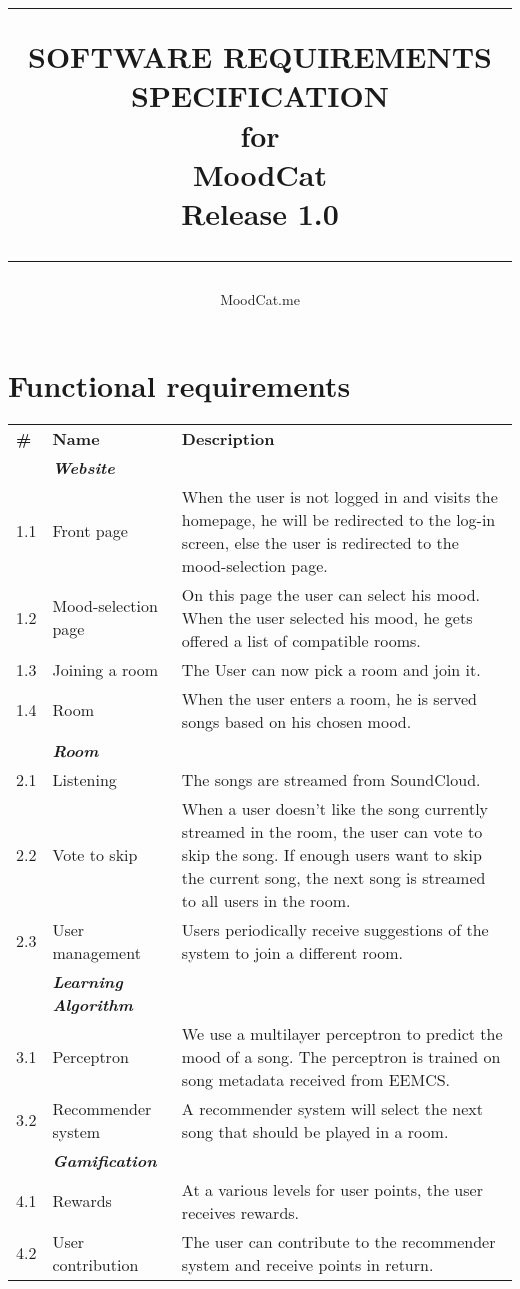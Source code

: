 \documentclass{scrreprt}
\title{%
\flushright
\rule{16cm}{5pt}\vskip1cm
\Huge{SOFTWARE REQUIREMENTS\\ SPECIFICATION}\\
\vspace{2cm}
for\\
\vspace{2cm}
MoodCat\\
\vspace{2cm}
\LARGE{Release 1.0\\}
\vfill
\rule{16cm}{5pt}
}
\author{MoodCat.me}
\date{}
\begin{document}
\maketitle



\chapter*{Functional requirements}
\begin{table}[h]
\begin{tabular}{|p{0.5cm}|p{3.8cm}|p{13.4cm}|}
\textbf{\#} & \textbf{Name} & \textbf{Description} \\
         & \textbf{\textit{Website}} &  \\
   	  1.1   & Front page & When the user is not logged in and visits the homepage, he will be redirected to the log-in screen, else the user is redirected to the mood-selection page.  \\
      1.2   & Mood-selection page & On this page the user can select his mood. When the user selected his mood, he gets offered a list of compatible rooms.\\
      1.3	& Joining a room & The User can now pick a room and join it. \\
      1.4  	& Room & When the user enters a room, he is served songs based on his chosen mood. \\   
      		 
       	& \textbf{\textit{Room}} & \\
	  2.1   & Listening & The songs are streamed from SoundCloud.\\
	  2.2   & Vote to skip & When a user doesn't like the song currently streamed in the room, the user can vote to skip the song. If enough users want to skip the current song, the next song is streamed to all users in the room. \\
	  2.3   & User management  & Users periodically receive suggestions of the system to join a different room. \\
	  	& \textbf{\textit{Learning Algorithm}} & \\
	  3.1   & Perceptron & We use a multilayer perceptron to predict the mood of a song. The perceptron is trained on song metadata received from EEMCS.\\
	  3.2   & Recommender system & A recommender system will select the next song that should be played in a room. \\  
         & \textbf{\textit{Gamification}} &  \\
      4.1   & Rewards  & At a various levels for user points, the user receives rewards.     \\
      4.2	& User contribution & The user can contribute to the recommender system and receive points in return. \\
\end{tabular}
\end{table}
	
\end{document}
